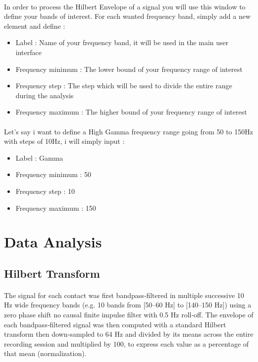 \documentclass[a4paper]{article}
\begin{document}
\paragraph{} In order to process the Hilbert Envelope of a signal you will use this window to define your bands of interest. 
For each wanted frequency band, simply add a new element and define : 
\begin{itemize}
\item Label : Name of your frequency band, it will be used in the main user interface
\item Frequency minimum : The lower bound of your frequency range of interest
\item Frequency step : The step which will be used to divide the entire range during the analysis
\item Frequency maximum : The higher bound of your frequency range of interest
\end{itemize}

\paragraph{} Let's say i want to define a High Gamma frequency range going from 50 to 150Hz with steps of 10Hz,  i will simply input :
\begin{itemize}
\item Label : Gamma
\item Frequency minimum : 50
\item Frequency step : 10
\item Frequency maximum : 150
\end{itemize}

\newpage
\section{Data Analysis} \label{analysis}    
\subsection{Hilbert Transform}
\paragraph{} The signal for each contact was first bandpass‐filtered in multiple successive 10 Hz wide frequency bands (e.g. 10 bands from [50–60 Hz] to [140–150 Hz]) using a zero phase shift no causal finite impulse filter with 0.5 Hz roll‐off. The envelope of each bandpass‐filtered signal was then computed with a standard Hilbert transform then down‐sampled to 64 Hz and divided by its means across the entire recording session and multiplied by 100, to express each value as a percentage of that mean (normalization).  
\end{document}
